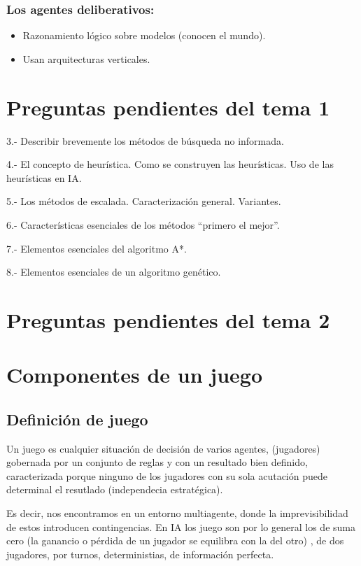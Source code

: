\documentclass[a4paper]{article}
\begin{document}
\subsubsection*{Los agentes deliberativos: }

\begin{itemize}
  \item Razonamiento lógico sobre modelos (conocen el mundo).
  \item Usan arquitecturas verticales.
\end{itemize}

\newpage

\section{Preguntas pendientes del tema 1}
3.- Describir brevemente los métodos de búsqueda no informada.

4.- El concepto de heurística. Como se construyen las heurísticas. Uso de las heurísticas en IA.

5.- Los métodos de escalada. Caracterización general. Variantes.

6.- Características esenciales de los métodos “primero el mejor”.

7.- Elementos esenciales del algoritmo A*.

8.- Elementos esenciales de un algoritmo genético.

\section{Preguntas pendientes del tema 2}

\section{Componentes de un juego}
\subsection{Definición de juego}

Un juego es cualquier situación de decisión de varios agentes, (jugadores)
gobernada por un conjunto de reglas y con un resultado bien definido, caracterizada porque ninguno de los 
jugadores con su sola acutación puede determinal el resutlado (independecia estratégica). 

Es decir, nos encontramos en un entorno multiagente, donde la imprevisibilidad de estos introducen 
contingencias. En IA los juego son por lo general los de suma cero (la ganancio o pérdida de un jugador se equilibra con la del otro)
, de dos jugadores, por turnos, deterministias,
de información perfecta. 
\end{document}
